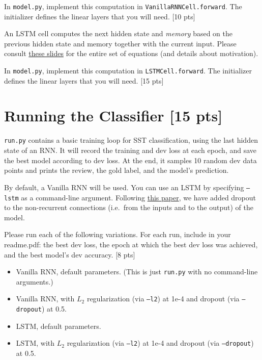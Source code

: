 \documentclass[11pt]{article}
\begin{document}
\noindent In \texttt{model.py}, implement this computation in \texttt{VanillaRNNCell.forward}.  The initializer defines the linear layers that you will need. \hfill [10 pts]


\vspace{2em}
 An LSTM cell computes the next hidden state and \emph{memory} based on the previous hidden state and memory together with the current input.  Please consult \href{https://www.shane.st/teaching/575k/spr21/slides/8_lstm.pdf}{these slides} for the entire set of equations (and details about motivation).

\noindent In \texttt{model.py}, implement this computation in \texttt{LSTMCell.forward}.  The initializer defines the linear layers that you will need. \hfill [15 pts]



\section{Running the Classifier [15 pts]}

\texttt{run.py} contains a basic training loop for SST classification, using the last hidden state of an RNN. It will record the training and dev loss at each epoch, and save the best model according to dev loss.  At the end, it samples 10 random dev data points and prints the review, the gold label, and the model's prediction.

\vspace{2em}
 By default, a Vanilla RNN will be used.  You can use an LSTM by specifying \texttt{--lstm} as a command-line argument.  Following \href{https://arxiv.org/abs/1409.2329}{this paper}, we have added dropout to the non-recurrent connections (i.e.\ from the inputs and to the output) of the model.

\noindent Please run each of the following variations.  For each run, include in your readme.pdf: the best dev loss, the epoch at which the best dev loss was achieved, and the best model's dev accuracy. \hfill [8 pts]
\begin{itemize}
  \item Vanilla RNN, default parameters.  (This is just \texttt{run.py} with no command-line arguments.)
  \item Vanilla RNN, with $L_2$ regularization (via \texttt{--l2}) at 1e-4 and dropout (via \texttt{--dropout}) at 0.5.
  \item LSTM, default parameters. 
  \item LSTM, with $L_2$ regularization (via \texttt{--l2}) at 1e-4 and dropout (via \texttt{--dropout}) at 0.5.
\end{itemize}
\end{document}
